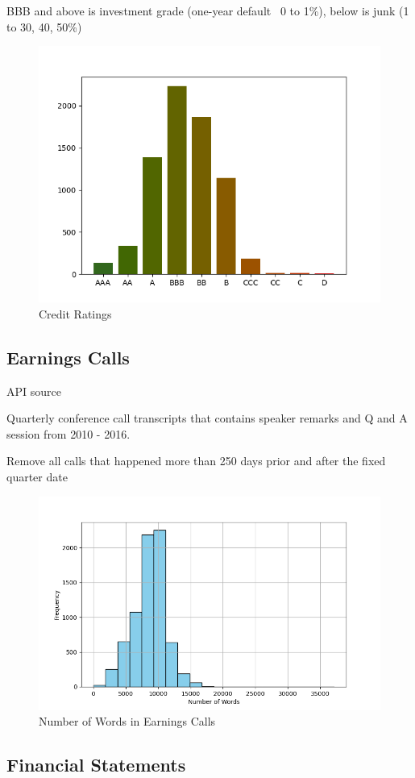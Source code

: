 \documentclass{article}
\begin{document}
    BBB and above is investment grade (one-year default ~0 to 1\%), below is junk (1 to 30, 40, 50\%)

    \begin{figure}[h!]
		\centering
        \caption{Credit Ratings}
        \includegraphics[width=0.5\linewidth,keepaspectratio=true]{../Output/All Data EDA/Tabular EDA/Distribution of Rating Issuances_no_title.png}
	\end{figure}

    \subsection*{Earnings Calls}

    API source

    Quarterly conference call transcripts that contains speaker remarks and Q and A session from 2010 - 2016.

    Remove all calls that happened more than 250 days prior and after the fixed quarter date

    \begin{figure}[h!]
		\centering
        \caption{Number of Words in Earnings Calls}
        \includegraphics[width=0.5\linewidth,keepaspectratio=true]{../Output/All Data EDA/NLP EDA/all_data_num_words_distribution_no_title.png}
	\end{figure}

    \subsection*{Financial Statements}
\end{document}
